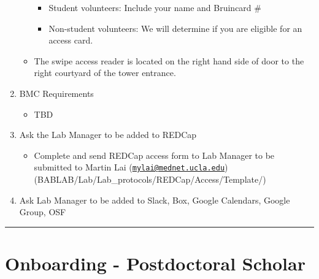 \documentclass[]{book}
\providecommand{\tightlist}{%
  \setlength{\itemsep}{0pt}\setlength{\parskip}{0pt}}
\begin{document}
\begin{enumerate}
\begin{itemize}
    \begin{itemize}
    \tightlist
    \item
      Student volunteers: Include your name and Bruincard \#
    \item
      Non-student volunteers: We will determine if you are eligible for an access card.
    \end{itemize}
  \item
    The swipe access reader is located on the right hand side of door to the right courtyard of the tower entrance.
  \end{itemize}
\item
  BMC Requirements

  \begin{itemize}
  \tightlist
  \item
    TBD
  \end{itemize}
\item
  Ask the Lab Manager to be added to REDCap

  \begin{itemize}
  \tightlist
  \item
    Complete and send REDCap access form to Lab Manager to be submitted to Martin Lai (\href{mailto:mylai@mednet.ucla.edu}{\nolinkurl{mylai@mednet.ucla.edu}}) (BABLAB/Lab/Lab\_protocols/REDCap/Access/Template/)
  \end{itemize}
\item
  Ask Lab Manager to be added to Slack, Box, Google Calendars, Google Group, OSF
\end{enumerate}

\begin{center}\rule{0.5\linewidth}{0.5pt}\end{center}

\hypertarget{onboarding---postdoctoral-scholar}{%
\section{Onboarding - Postdoctoral Scholar}\label{onboarding---postdoctoral-scholar}}
\end{document}
